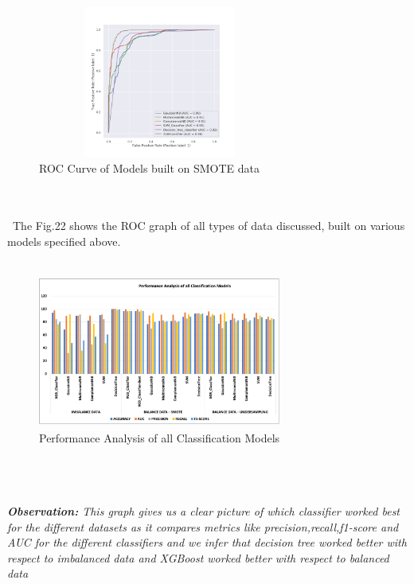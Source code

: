 \documentclass[a4paper, 10pt, conference]{ieeeconf}      %
\begin{document}
\begin{figure}[htp]
    \centering
    \includegraphics[width=8cm,height=5cm]{Images/Roc_with_SMOTE_final.png}
    \caption{ROC Curve of Models built on SMOTE data}
    \label{fig:Roc Curve of Models built on SMOTE data}
\end{figure}
\\\
\\\
The Fig.22 shows the ROC graph of all types of data discussed, built on various models specified above. 
\\\
\begin{figure}[htp]
    \centering
    \includegraphics[width=8cm,height=5cm]{Images/performanceAnalysis.png}
    \caption{Performance Analysis of all Classification Models}
    \label{fig:PerformanceAnalysis}
\end{figure}
\\\
\\\
\\\textit{\textbf{Observation:} 
This graph gives us a clear picture of which classifier worked best for the different datasets as it compares metrics like precision,recall,f1-score and AUC for the different classifiers and we infer that decision tree worked better with respect to imbalanced data and XGBoost worked better with respect to balanced data}
\\\
\\\
\end{document}
